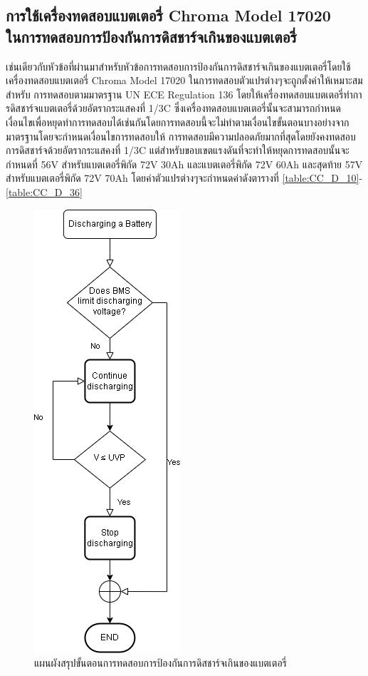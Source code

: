 \subsection{การใช้เครื่องทดสอบแบตเตอรี่ Chroma Model 17020 \\ ในการทดสอบการป้องกันการดิสชาร์จเกินของแบตเตอรี่}
เช่นเดียวกับหัวข้อที่ผ่านมาสำหรับหัวข้อการทดสอบการป้องกันการดิสชาร์จเกินของแบตเตอรี่โดยใช้เครื่องทดสอบแบตเตอรี่ Chroma Model 17020 ในการทดสอบตัวแปรต่างๆจะถูกตั้งค่าให้เหมาะสมสำหรับ
การทดสอบตามมาตรฐาน UN ECE Regulation 136 โดยให้เครื่องทดสอบแบตเตอรี่ทำการดิสชาร์จแบตเตอรี่ด้วยอัตรากระแสคงที่ 1/3C ซึ่งเครื่องทดสอบแบตเตอรี่นั้นจะสามารถกำหนดเงื่อนไขเพื่อหยุดทำการทดสอบได้เช่นกันโดยการทดสอบนี้จะไม่ทำตามเงื่อนไขขั้นตอนบางอย่างจากมาตรฐานโดยจะกำหนดเงื่อนไขการทดสอบให้
การทดสอบมีความปลอดภัยมากที่สุดโดยยังคงทดสอบการดิสชาร์จด้วยอัตรากระแสคงที่ 1/3C แต่สำหรับขอบเขตแรงดันที่จะทำให้หยุดการทดสอบนั้นจะกำหนดที่ 
56V สำหรับแบตเตอรี่พิกัด 72V 30Ah และแบตเตอรี่พิกัด 72V 60Ah และสุดท้าย 57V สำหรับแบตเตอรี่พิกัด 72V 70Ah โดยค่าตัวแปรต่างๆจะกำหนดค่าดังตารางที่
\ref{table:CC_D_10}-\ref{table:CC_D_36}
\begin{center}
	\begin{figure}[H]
		\includegraphics[width=0.25\linewidth]{Chapters/img/R136_DEMO/Discharging_flow_chart.png}
		\centering
		\captionsetup{justification=centering,margin=2cm}
		\caption{แผนผังสรุปขั้นตอนการทดสอบการป้องกันการดิสชาร์จเกินของแบตเตอรี่}
	\end{figure}
\end{center}

